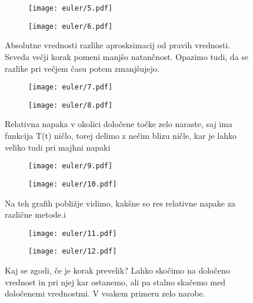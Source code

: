 \documentclass{article}
\begin{document}
\begin{figure}[H]
\begin{subfigure}{.5\textwidth}
\texttt{[image: euler/5.pdf]}
\end{subfigure}
\begin{subfigure}{.5\textwidth}
\texttt{[image: euler/6.pdf]}
\end{subfigure}
\caption*{Absolutne vrednosti razlike aprosksimacij od pravih vrednosti. Seveda večji korak pomeni manjšo natančnost. Opazimo tudi, da se razlike pri večjem času potem zmanjšujejo.}
\end{figure}

\begin{figure}[H]
\begin{subfigure}{.5\textwidth}
\texttt{[image: euler/7.pdf]}
\end{subfigure}
\begin{subfigure}{.5\textwidth}
\texttt{[image: euler/8.pdf]}
\end{subfigure}
\caption*{Relativna napaka v okolici določene točke zelo naraste, saj ima funkcija T(t) ničlo, torej delimo z nečim blizu ničle, kar je lahko veliko tudi pri majhni napaki}
\end{figure}

\begin{figure}[H]
\begin{subfigure}{.5\textwidth}
\texttt{[image: euler/9.pdf]}
\end{subfigure}
\begin{subfigure}{.5\textwidth}
\texttt{[image: euler/10.pdf]}
\end{subfigure}
\caption*{Na teh grafih pobližje vidimo, kakšne so res relativne napake za različne metode.i}
\end{figure}

\begin{figure}[H]
\begin{subfigure}{.5\textwidth}
\texttt{[image: euler/11.pdf]}
\end{subfigure}
\begin{subfigure}{.5\textwidth}
\texttt{[image: euler/12.pdf]}
\end{subfigure}
\caption*{Kaj se zgodi, če je korak prevelik? Lahko skočimo na določeno vrednost in pri njej kar ostanemo, ali pa stalno skačemo med določenemi vrednostmi. V vsakem primeru zelo narobe.}
\end{figure}
\newpage
\end{document}
